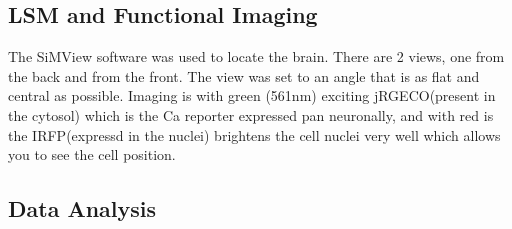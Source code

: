     \subsection{LSM and Functional Imaging}
    The SiMView software was used to locate the brain. There are 2 views, one from the back and from the front. The view was set to an angle that is as flat and central as possible. Imaging is with green (561nm) exciting jRGECO(present in the cytosol) which is the Ca reporter expressed pan neuronally, and with red is the IRFP(expressd in the nuclei) brightens the cell nuclei very well which allows you to see the cell position. 
    \subsection{Data Analysis}



